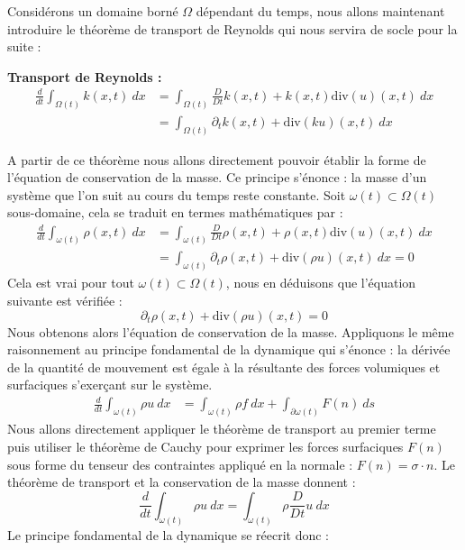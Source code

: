 Considérons un domaine borné $\Omega$ dépendant du temps, nous allons maintenant introduire le théorème de transport de Reynolds qui nous servira de socle pour la suite :
\begin{theorembox}
    \begin{theorem}
        \textbf{Transport de Reynolds :}
        \begin{align*}
            \frac{d}{dt} \int_{\Omega(t)} k(x,t) \ dx &= \int_{\Omega(t)} \frac{D}{Dt}k(x,t) + k(x,t)\text{div}(u)(x,t) \ dx \\
            &= \int_{\Omega(t)} \partial_t k(x,t) + \text{div}(ku)(x,t) \ dx
        \end{align*}
    \end{theorem}
\end{theorembox}
A partir de ce théorème nous allons directement pouvoir établir la forme de l'équation de conservation de la masse. Ce principe s'énonce : la masse d'un système que l'on suit au cours du temps reste constante. 
Soit $\omega(t) \subset \Omega(t)$ sous-domaine, cela se traduit en termes mathématiques par :
\begin{align*}
    \frac{d}{dt} \int_{\omega(t)} \rho(x,t) \ dx &= \int_{\omega(t)} \frac{D}{Dt}\rho(x,t) + \rho(x,t)\text{div}(u)(x,t) \ dx \\
    &= \int_{\omega(t)} \partial_t \rho(x,t) + \text{div}(\rho u)(x,t) \ dx = 0
\end{align*}
Cela est vrai pour tout $\omega(t) \subset \Omega(t)$, nous en déduisons que l'équation suivante est vérifiée :
$$ \partial_t \rho(x,t) + \text{div}(\rho u)(x,t) = 0 $$
Nous obtenons alors l'équation de conservation de la masse.
Appliquons le même raisonnement au principe fondamental de la dynamique qui s'énonce : la dérivée de la quantité de mouvement est égale à la résultante des forces volumiques et surfaciques s'exerçant sur le système.
\begin{align*}
    \frac{d}{dt} \int_{\omega(t)} \rho u \ dx &= \int_{\omega(t)} \rho f \ dx + \int_{\partial \omega(t)} F(n) \ ds
\end{align*}
Nous allons directement appliquer le théorème de transport au premier terme puis utiliser le théorème de Cauchy pour exprimer les forces surfaciques $F(n)$ sous forme du tenseur des contraintes appliqué en la normale : $F(n) = \sigma \cdot n$. Le théorème de transport et la conservation de la masse donnent :
$$ \frac{d}{dt} \int_{\omega(t)} \rho u \ dx = \int_{\omega(t)} \rho \frac{D}{Dt}u \ dx $$
Le principe fondamental de la dynamique se réecrit donc :
